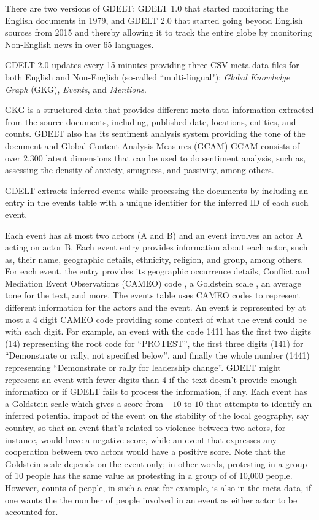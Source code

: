 \documentclass[a4, 11pt]{article}
\begin{document}
 There are two versions of GDELT: GDELT 1.0 that started monitoring the English
 documents in 1979, and GDELT 2.0 that started going beyond English sources from 2015 and thereby 
 allowing it to track the entire globe by monitoring Non-English news in over 65
 languages.

 GDELT 2.0 updates every 15 minutes providing three CSV meta-data files for both 
 English and Non-English (so-called ``multi-lingual"): \textit{Global Knowledge Graph} (GKG),
 \textit{Events}, and \textit{Mentions}. 

 GKG is a structured data that provides different meta-data information extracted from the
 source documents, including, published date, locations, entities, and counts. GDELT also
 has its sentiment analysis system providing the tone of the document and Global
 Content Analysis Measures (GCAM) \cite{GCAM} 
 GCAM consists of over 2,300 latent dimensions
 that can be used to do sentiment analysis, such as, assessing the density of
 anxiety, smugness, and passivity, among others. 

 GDELT extracts inferred events while processing the documents by including an entry in
 the events table with a unique identifier for the inferred ID of each such event.

 Each event has at most two actors (A and B) and an event involves an actor A
 acting on actor B. Each event entry provides information about each actor, such as,
 their name, geographic details, ethnicity, religion, and group, among others. 
 For each event, the entry provides its geographic occurrence details, Conflict and Mediation
 Event Observations (CAMEO) code \cite{CAMEO}, 
 a Goldstein scale \cite{Goldstein}, an average tone for the
 text, and more. The events table uses CAMEO codes to represent different
 information for the actors and the event. An event is represented by at most a
 4 digit CAMEO code providing some context of what the event could be with each
 digit. For example, an event with the code 1411 has the first two digits (14)
 representing the root code for ``PROTEST'', the first three digits (141) for
 ``Demonstrate or rally, not specified below'', and finally the whole number
 (1441) representing ``Demonstrate or rally for leadership change''. GDELT might
 represent an event with fewer digits than 4 if the text doesn't provide
 enough information or if GDELT fails to process the information, if any. Each
 event has a Goldstein scale which gives a score from $-10$ to $10$ that attempts to identify 
 an inferred potential impact of the event on the stability of the local geography, say country, so that
 an event that's related to violence between two actors, for instance, would have a negative score, while an event that expresses any cooperation between two actors would have a positive score. 
 Note that the Goldstein scale depends on the event only; in other words, protesting in a
 group of 10 people has the same value as protesting in a group of of 10,000 people. 
 However, counts of people, in such a case for example, is also in the meta-data, if one wants the the number of people involved in an event as either actor to be accounted for.
\end{document}
